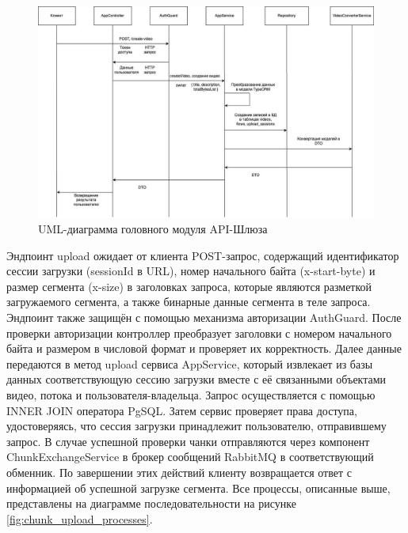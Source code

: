 	\begin{figure}[ht!] 
		\center
		\includegraphics [scale=0.37] {my_folder/images//create_video_processes}
		\caption{UML-диаграмма головного модуля API-Шлюза} 
		\label{fig:create_video_processes}  
	\end{figure}

	Эндпоинт upload ожидает от клиента POST-запрос, содержащий идентификатор сессии загрузки (sessionId в URL), номер начального байта (x-start-byte) и размер сегмента (x-size) в заголовках запроса, которые являются разметкой загружаемого сегмента, а также бинарные данные сегмента в теле запроса. Эндпоинт также защищён с помощью механизма авторизации AuthGuard. После проверки авторизации контроллер преобразует заголовки с номером начального байта и размером в числовой формат и проверяет их корректность. Далее данные передаются в метод upload сервиса AppService, который извлекает из базы данных соответствующую сессию загрузки вместе с её связанными объектами видео, потока и пользователя-владельца. Запрос осуществляется с помощью INNER JOIN оператора PgSQL. Затем сервис проверяет права доступа, удостоверяясь, что сессия загрузки принадлежит пользователю, отправившему запрос. В случае успешной проверки чанки отправляются через компонент ChunkExchangeService в брокер сообщений RabbitMQ в соответствующий обменник. По завершении этих действий клиенту возвращается ответ с информацией об успешной загрузке сегмента. Все процессы, описанные выше, представлены на диаграмме последовательности на рисунке \ref{fig:chunk_upload_processes}.

